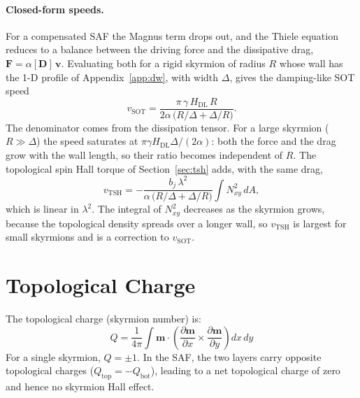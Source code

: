 \documentclass[11pt,a4paper]{article}
\newcommand{\mb}[1]{\mathbf{#1}}
\begin{document}
\paragraph{Closed-form speeds.}
For a compensated SAF the Magnus term drops out, and the Thiele
equation reduces to a balance between the driving force and the
dissipative drag, $\mb{F} = \alpha[\mb{D}]\,\mb{v}$.  Evaluating
both for a rigid skyrmion of radius $R$ whose wall has the 1-D
profile of Appendix~\ref{app:dw}, with width $\Delta$, gives the
damping-like SOT speed~\cite{pham2024}
%
\begin{equation}
v_{\text{SOT}} =
    \frac{\pi\,\gamma\, H_{\text{DL}}\, R}
         {2\alpha\,\bigl(R/\Delta + \Delta/R\bigr)} .
\label{eq:v_sot}
\end{equation}
%
The denominator comes from the dissipation tensor.  For a large
skyrmion ($R \gg \Delta$) the speed saturates at
$\pi\gamma H_{\text{DL}}\Delta/(2\alpha)$: both the force and the
drag grow with the wall length, so their ratio becomes independent
of $R$.  The topological spin Hall torque of
Section~\ref{sec:tsh} adds, with the same drag,
%
\begin{equation}
v_{\text{TSH}} =
    -\frac{b_j\,\lambda^2}
          {\alpha\,\bigl(R/\Delta + \Delta/R\bigr)}
    \int N_{xy}^2\, dA ,
\label{eq:v_tsh}
\end{equation}
%
which is linear in $\lambda^2$.  The integral of $N_{xy}^2$
decreases as the skyrmion grows, because the topological density
spreads over a longer wall, so $v_{\text{TSH}}$ is largest for
small skyrmions and is a correction to $v_{\text{SOT}}$.

\section{Topological Charge}
\label{sec:topcharge}

The topological charge (skyrmion number) is:
%
\begin{equation}
Q = \frac{1}{4\pi} \int \mb{m} \cdot \left(
    \frac{\partial \mb{m}}{\partial x} \times
    \frac{\partial \mb{m}}{\partial y}
\right) dx \, dy
\end{equation}
%
For a single skyrmion, $Q = \pm 1$. In the SAF, the two layers carry
opposite topological charges
($Q_{\text{top}} = -Q_{\text{bot}}$), leading to a net topological
charge of zero and hence no skyrmion Hall effect.
\end{document}
